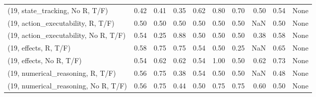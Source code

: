 \begin{table*}[h!]
\begin{adjustbox}{width=2\columnwidth,center}
\begin{tabular}{lrrr|rrr|rrr}
(19, state\_tracking, No R, T/F)       &                      0.42 &                  0.41 &                      0.35 &                          0.62 &                      0.80 &                          0.70 &                                   0.50 &                               0.54 &                                  None \\
(19, action\_executability, R, T/F)    &                      0.50 &                  0.50 &                      0.50 &                          0.50 &                      0.50 &                          0.50 &                                    NaN &                               0.50 &                                  None \\
(19, action\_executability, No R, T/F) &                      0.54 &                  0.25 &                      0.88 &                          0.50 &                      0.50 &                          0.50 &                                   0.38 &                               0.58 &                                  None \\
(19, effects, R, T/F)                 &                      0.58 &                  0.75 &                      0.75 &                          0.54 &                      0.50 &                          0.25 &                                    NaN &                               0.65 &                                  None \\
(19, effects, No R, T/F)              &                      0.54 &                  0.62 &                      0.62 &                          0.54 &                      1.00 &                          0.50 &                                   0.62 &                               0.73 &                                  None \\
(19, numerical\_reasoning, R, T/F)     &                      0.56 &                  0.75 &                      0.38 &                          0.54 &                      0.50 &                          0.50 &                                    NaN &                               0.48 &                                  None \\
(19, numerical\_reasoning, No R, T/F)  &                      0.56 &                  0.75 &                      0.44 &                          0.50 &                      0.75 &                          0.75 &                                   0.60 &                               0.50 &                                  None \\

\end{tabular}
\end{adjustbox}
\end{table*}
